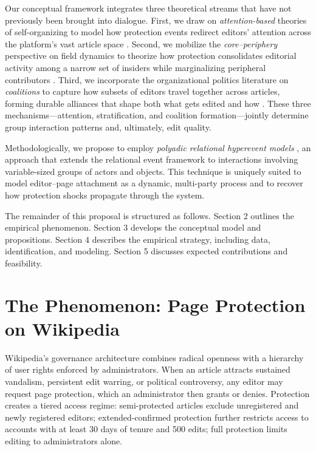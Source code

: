 \documentclass[11pt]{article}
\begin{document}
Our conceptual framework integrates three theoretical streams that have not previously been brought into dialogue. First, we draw on \emph{attention-based} theories of self-organizing to model how protection events redirect editors' attention across the platform's vast article space \citep{Tonellato2024}. Second, we mobilize the \emph{core--periphery} perspective on field dynamics to theorize how protection consolidates editorial activity among a narrow set of insiders while marginalizing peripheral contributors \citep{Cattani2014, Borgatti2000}. Third, we incorporate the organizational politics literature on \emph{coalitions} to capture how subsets of editors travel together across articles, forming durable alliances that shape both what gets edited and how \citep{March1962, Stevenson1985, Levinthal2024}. These three mechanisms---attention, stratification, and coalition formation---jointly determine group interaction patterns and, ultimately, edit quality.

Methodologically, we propose to employ \emph{polyadic relational hyperevent models} \citep{Lerner2023}, an approach that extends the relational event framework \citep{Butts2008} to interactions involving variable-sized groups of actors and objects. This technique is uniquely suited to model editor--page attachment as a dynamic, multi-party process and to recover how protection shocks propagate through the system.

The remainder of this proposal is structured as follows. Section 2 outlines the empirical phenomenon. Section 3 develops the conceptual model and propositions. Section 4 describes the empirical strategy, including data, identification, and modeling. Section 5 discusses expected contributions and feasibility.


\section{The Phenomenon: Page Protection on Wikipedia}

Wikipedia's governance architecture combines radical openness with a hierarchy of user rights enforced by administrators. When an article attracts sustained vandalism, persistent edit warring, or political controversy, any editor may request page protection, which an administrator then grants or denies. Protection creates a tiered access regime: semi-protected articles exclude unregistered and newly registered editors; extended-confirmed protection further restricts access to accounts with at least 30 days of tenure and 500 edits; full protection limits editing to administrators alone.
\end{document}
